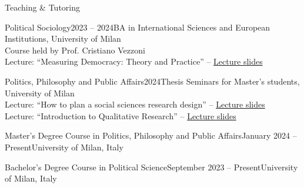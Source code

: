 \documentclass{cv} %
\begin{document}
\begin{rSection}{Teaching \& Tutoring}

\subtitle{Guest Lectures}

\begin{rTeachingSection}{Political Sociology}{2023 -- 2024}{BA in International Sciences and European Institutions, University of Milan}\\ 
Course held by Prof. Cristiano Vezzoni \\    
Lecture: “Measuring Democracy: Theory and Practice” -- \href{https://github.com/ste-sangiovanni/democracy_seminar}{Lecture slides}   
\end{rTeachingSection}
\begin{rTeachingSection}{Politics, Philosophy and Public Affairs}{2024}{Thesis Seminars for Master's students, University of Milan} \\ 
Lecture: “How to plan a social sciences research design” -- \href{https://github.com/ste-sangiovanni/PPPA_Thesis_Seminar}{Lecture slides}  \\ 
Lecture: “Introduction to Qualitative Research” -- \href{https://github.com/ste-sangiovanni/PPPA_Thesis_Seminar}{Lecture slides}   
\end{rTeachingSection}
    
\subtitle{Academic Tutoring \& Teaching Assistant}

\begin{rTeachingSection}{Master’s Degree Course in Politics, Philosophy and Public Affairs}{January 2024  -- Present}{University of Milan, Italy}
\end{rTeachingSection} 
\begin{rTeachingSection}{Bachelor’s Degree Course in Political Science}{September 2023 -- Present}{University of Milan, Italy}
\end{rTeachingSection} 
\end{rSection}
    
\newpage
\end{document}
